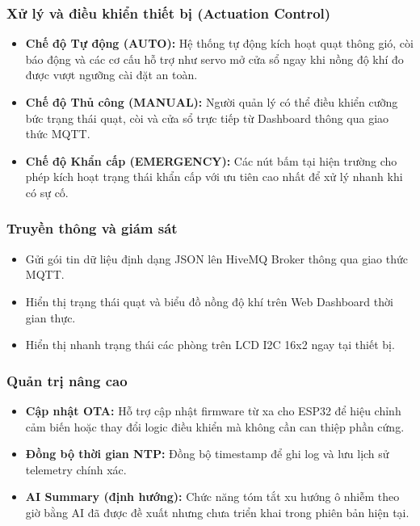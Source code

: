 \documentclass[../BTL_PTIT.tex]{subfiles}
\begin{document}
\subsubsection{Xử lý và điều khiển thiết bị (Actuation Control)}
\begin{itemize}
    \item \textbf{Chế độ Tự động (AUTO):} Hệ thống tự động kích hoạt quạt thông gió, còi báo động và các cơ cấu hỗ trợ như servo mở cửa sổ ngay khi nồng độ khí đo được vượt ngưỡng cài đặt an toàn.
    \item \textbf{Chế độ Thủ công (MANUAL):} Người quản lý có thể điều khiển cưỡng bức trạng thái quạt, còi và cửa sổ trực tiếp từ Dashboard thông qua giao thức MQTT.
    \item \textbf{Chế độ Khẩn cấp (EMERGENCY):} Các nút bấm tại hiện trường cho phép kích hoạt trạng thái khẩn cấp với ưu tiên cao nhất để xử lý nhanh khi có sự cố.
\end{itemize}

\subsubsection{Truyền thông và giám sát}
\begin{itemize}
    \item Gửi gói tin dữ liệu định dạng JSON lên HiveMQ Broker thông qua giao thức MQTT.
    \item Hiển thị trạng thái quạt và biểu đồ nồng độ khí trên Web Dashboard thời gian thực.
    \item Hiển thị nhanh trạng thái các phòng trên LCD I2C 16x2 ngay tại thiết bị.
\end{itemize}

\subsubsection{Quản trị nâng cao}
\begin{itemize}
    \item \textbf{Cập nhật OTA:} Hỗ trợ cập nhật firmware từ xa cho ESP32 để hiệu chỉnh cảm biến hoặc thay đổi logic điều khiển mà không cần can thiệp phần cứng.
    \item \textbf{Đồng bộ thời gian NTP:} Đồng bộ timestamp để ghi log và lưu lịch sử telemetry chính xác.
    \item \textbf{AI Summary (định hướng):} Chức năng tóm tắt xu hướng ô nhiễm theo giờ bằng AI đã được đề xuất nhưng chưa triển khai trong phiên bản hiện tại.
\end{itemize}
\end{document}
